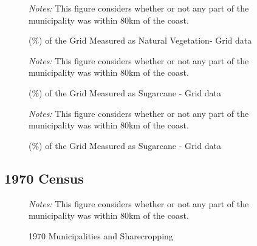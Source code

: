 \documentclass{article}
\begin{document}
\begin{figure}
  \caption{(\%) of the Grid Measured as Natural Vegetation- Grid data}
  \begin{center}
  \textit{Notes:} This figure considers whether or not any part of the municipality was within 80km of the coast.
  \end{center}
  \label{fig:natural_grid}
\end{figure}

\begin{figure}
  \caption{(\%) of the Grid Measured as Sugarcane - Grid data}
  \begin{center}
  \textit{Notes:} This figure considers whether or not any part of the municipality was within 80km of the coast.
  \end{center}
  \label{fig:sugarcane_grid}
\end{figure}

\begin{figure}
  \caption{(\%) of the Grid Measured as Sugarcane - Grid data}
  \begin{center}
  \textit{Notes:} This figure considers whether or not any part of the municipality was within 80km of the coast.
  \end{center}
  \label{fig:sugarcane_area_grid}
\end{figure}

\clearpage

\subsection*{1970 Census}

\begin{figure}[h!]
  \caption{1970 Municipalities and Sharecropping}
  \begin{center}
  \textit{Notes:} This figure considers whether or not any part of the municipality was within 80km of the coast.
  \end{center}
  \label{fig:sharecropping_1970}
\end{figure}
\end{document}
